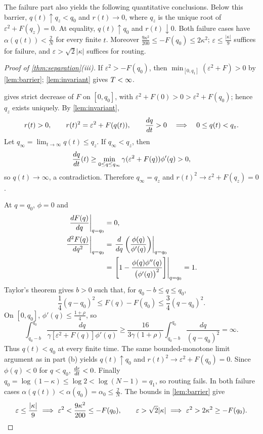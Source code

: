 The failure part also yields the following quantitative conclusions.
Below this barrier, $q(t)\uparrow q_z<q_0$ and $r(t)\to0$, where $q_z$ is the unique root of $\varepsilon^2+F(q_z)=0$.
At equality, $q(t)\uparrow q_0$ and $r(t)\downarrow0$.
Both failure cases have $\alpha(q(t))<\tfrac{2}{N}$ for every finite $t$.
Moreover $\tfrac{9\kappa^2}{200}\le-F(q_0)\le2\kappa^2$;
$\varepsilon\le\tfrac{|\kappa|}{9}$ suffices for failure, and $\varepsilon>\sqrt2|\kappa|$ suffices for routing.
\begin{proof}[Proof of \cref{thm:separation}(iii)]
If $\varepsilon^2>-F(q_0)$, then $\min_{[0,q_1]}(\varepsilon^2+F)>0$ by \cref{lem:barrier}; \cref{lem:invariant} gives $T<\infty$.

 gives strict decrease of $F$ on $[0,q_0]$, with
$\varepsilon^2+F(0)>0>\varepsilon^2+F(q_0)$; hence $q_z$ exists uniquely.
By \cref{lem:invariant},
\[
 r(t)>0,\qquad r(t)^2=\varepsilon^2+F(q(t)),\qquad\frac{d q}{d t}>0
 \quad\Longrightarrow\quad 0\le q(t)<q_z.
\]
Let $q_\infty=\lim_{t\to\infty}q(t)\le q_z$.
If $q_\infty<q_z$, then
\[
 \frac{d q}{d t}(t)\ge\min_{0\le q\le q_\infty}
 \gamma(\varepsilon^2+F(q))\phi'(q)>0,
\]
so $q(t)\to\infty$, a contradiction. Therefore $q_\infty=q_z$ and
$r(t)^2\to \varepsilon^2+F(q_z)=0$.


At $q=q_0$, $\phi=0$ and
\begin{align*}
 \left.\frac{d F(q)}{d q}\right|_{q=q_0}&=0,\\
 \left.\frac{d^2F(q)}{dq^2}\right|_{q=q_0}
 &=\left.\frac{d }{d q}\left(\frac{\phi(q)}{\phi'(q)}\right)\right|_{q=q_0}\\
 &=\left.\left[1-\frac{\phi(q)\phi''(q)}{\bigl(\phi'(q)\bigr)^2}\right]\right|_{q=q_0}=1.
\end{align*}
Taylor's theorem gives $b>0$ such that, for $q_0-b\le q\le q_0$,
\[
 \frac{1}{4}(q-q_0)^2\le F(q)-F(q_0)\le\frac{3}{4}(q-q_0)^2.
\]
On $[0,q_0]$, $\phi'(q)\le\tfrac{1+\rho}{4}$, so
\[
 \int_{q_0-b}^{q_0}\frac{dq}{\gamma[\varepsilon^2+F(q)]\phi'(q)}
 \ge\frac{16}{3\gamma(1+\rho)}\int_{q_0-b}^{q_0}\frac{dq}{(q-q_0)^2}=\infty.
\]
Thus $q(t)<q_0$ at every finite time.
The same bounded-monotone limit argument as in part (b) yields
$q(t)\uparrow q_0$ and $r(t)^2\to \varepsilon^2+F(q_0)=0$.
Since $\phi(q)<0$ for $q<q_0$, $\frac{d r}{d t}<0$.
Finally $q_0=\log(1-\kappa)\le\log2<\log(N-1)=q_1$, so routing fails. In both failure cases $\alpha(q(t))<\alpha(q_0)=\alpha_0\le\tfrac{2}{N}$.
The bounds in \cref{lem:barrier} give
\[
 \varepsilon\le\frac{|\kappa|}{9}\ \Longrightarrow\ \varepsilon^2<\frac{9\kappa^2}{200}\le-F(q_0),\qquad
 \varepsilon>\sqrt2|\kappa|\ \Longrightarrow\ \varepsilon^2>2\kappa^2\ge-F(q_0).\qedhere
\]
\end{proof}
